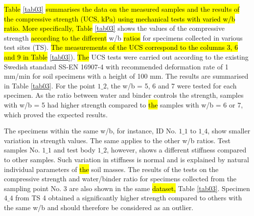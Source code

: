 \documentclass[sustainability,article,submit,pdftex,moreauthors]{Definitions/mdpi}
\begin{document}
\hl{Table} \ref{tab03} \hl{summarises the data on the measured samples and the results of the compressive strength (UCS, kPa) using mechanical tests with varied w/b ratio. More specifically, Table} \ref{tab03} shows the values of the compressive strength \hl{according to the different} w/b \hl{ratios }for specimens collected in various test sites (TS). \hl{The measurements of the UCS correspond to the columns 3, 6 and 9 in Table} \ref{tab03}). \hl{The} UCS tests were carried out according to the existing Swedish standard SS-EN 16907-4 \cite{SIS2018} with recommended deformation rate of 1 mm/min for soil specimens with a height of 100 mm. The results are summarised in Table \ref{tab03}. For the point $1\_2$, the w/b = 5, 6 and 7 were tested for each specimen. As the ratio between water and binder controls the strength, samples with w/b = 5 had higher strength compared to \hl{the }samples with w/b = 6 or 7, which proved the expected results. 

The specimens within the same w/b, for instance, ID No. $1\_1$ to $1\_4$, show smaller variation in strength values. The same applies to the other w/b ratios. Test samples No. $1\_1$ and test body $1\_2$, however, shows a different stiffness compared to other samples. Such\hl{ }variation in stiffness is normal and is explained by\hl{ }natural individual parameters of \hl{the }soil masses. The results of the tests on the compressive strength and water/binder ratio for specimens collected from the sampling point No. 3 are also shown in the same \hl{dataset, }Table \ref{tab03}. Specimen $4\_4$ from TS 4 obtained a significantly higher strength compared to\hl{ }others with the same w/b and should therefore be considered as an outlier.
\end{document}
